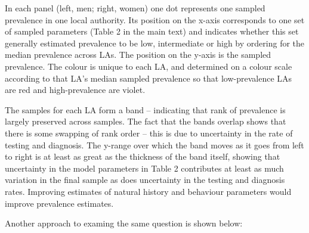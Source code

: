 \documentclass{article}
\begin{document}
    In each panel (left, men; right, women) one dot represents one sampled
prevalence in one local authority. Its position on the x-axis
corresponds to one set of sampled parameters (Table 2 in the main text)
and indicates whether this set generally estimated prevalence to be low,
intermediate or high by ordering for the median prevalence across LAs.
The position on the y-axis is the sampled prevalence. The colour is
unique to each LA, and determined on a colour scale according to that
LA's median sampled prevalence so that low-prevalence LAs are red and
high-prevalence are violet.

The samples for each LA form a band -- indicating that rank of
prevalence is largely preserved across samples. The fact that the bands
overlap shows that there is some swapping of rank order -- this is due
to uncertainty in the rate of testing and diagnosis. The y-range over
which the band moves as it goes from left to right is at least as great
as the thickness of the band itself, showing that uncertainty in the
model parameters in Table 2 contributes at least as much variation in
the final sample as does uncertainty in the testing and diagnosis rates.
Improving estimates of natural history and behaviour parameters would
improve prevalence estimates.

Another approach to examing the same question is shown below:
\end{document}
